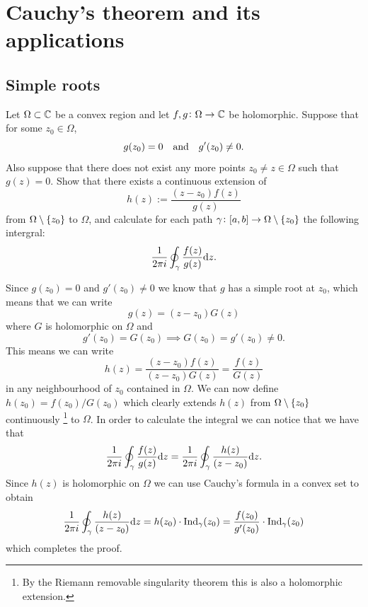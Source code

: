 \documentclass[11pt,a4paper]{article}
\begin{document}
\newpage
\section{Cauchy's theorem and its applications}

\subsection{Simple roots}
\begin{exercise}
  Let $\Omega \subset \mathbb{C}$ be a convex region and let
  $f,g \colon \Omega \to \mathbb{C}$ be holomorphic.
  Suppose that for some $z_0 \in \Omega$,
  \[
    g(z_0) = 0 \quad \text{and} \quad
    g'(z_0) \neq 0.
  \]
  Also suppose that there does not exist any more points
  $z_0 \neq z \in \Omega$ such that $g(z) = 0$.
  Show that there exists a continuous extension of
  \[
    h(z) := \frac{(z - z_0) f(z)}{g(z)}
  \]
  from $\Omega \setminus \left\{z_0\right\}$ to $\Omega$, and calculate for each
  path $\gamma \colon [a,b] \to \Omega \setminus \left\{z_0\right\}$
  the following intergral:
  \[
    \frac{1}{2 \pi i} \oint_{\gamma} \frac{f(z)}{g(z)} \mathrm{d} z.
  \]
\end{exercise}
\begin{solution}
  Since $g(z_0) = 0$ and $g'(z_0) \neq 0$ we know that $g$ has a simple root
  at $z_0$, which means that we can write
  \[
    g(z) = (z - z_0) G(z)
  \]
  where $G$ is holomorphic on $\Omega$ and
  \[
    g'(z_0) = G(z_0) \implies G(z_0) = g'(z_0) \neq 0.
  \]
  This means we can write
  \[
    h(z) =
    \frac{(z - z_0) f(z)}{(z - z_0) G(z)} =
    \frac{f(z)}{G(z)}
  \]
  in any neighbourhood of $z_0$ contained in $\Omega$.
  We can now define $h(z_0) = f(z_0) / G(z_0)$ which clearly extends
  $h(z)$ from $\Omega \setminus \left\{z_0\right\}$ continuously
  \footnote{By the Riemann removable singularity theorem this is also
  a holomorphic extension.}
  to $\Omega$.
  In order to calculate the integral we can notice that we have that
  \[
    \frac{1}{2 \pi i} \oint_{\gamma} \frac{f(z)}{g(z)} \mathrm{d} z =
    \frac{1}{2 \pi i} \oint_{\gamma} \frac{h(z)}{(z - z_0)} \mathrm{d} z.
  \]
  Since $h(z)$ is holomorphic on $\Omega$ we can use
  Cauchy's formula in a convex set to obtain
  \[
    \frac{1}{2 \pi i} \oint_{\gamma} \frac{h(z)}{(z - z_0)} \mathrm{d} z =
    h(z_0) \cdot \operatorname{Ind}_{\gamma}(z_0) =
    \frac{f(z_0)}{g'(z_0)} \cdot \operatorname{Ind}_{\gamma}(z_0)
  \]
  which completes the proof.
\end{solution}
\end{document}
